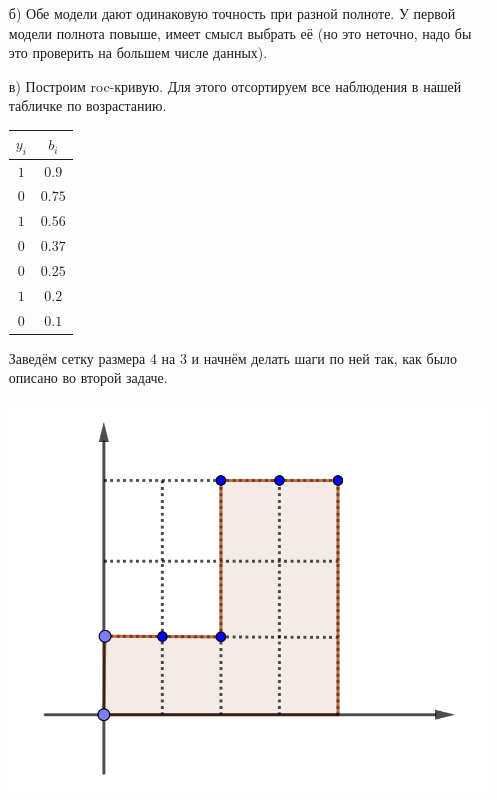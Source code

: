 \documentclass[12pt, a4paper, oneside]{article}
\begin{document}
{\begin{enumerate}
		Считаем для обоих случаев точность и полноту. 
		
		\begin{equation} 
		\begin{aligned}
		&Precision_1 = 0.5     \qquad &Recall_1 = 0.66  \\ 
		&Precision_2 = 0.5  \qquad &Recall_2 =  0.33   \\ 
		\end{aligned}
		\end{equation} 
		
		\item[б)]  Обе модели дают одинаковую точность при разной полноте. У первой модели полнота повыше, имеет смысл выбрать её (но это неточно, надо бы это проверить на большем числе данных). 
		
		\item[в)] Построим roc-кривую. Для этого отсортируем все наблюдения в нашей табличке по возрастанию.
		
		\begin{center}
			\begin{tabular}{c|c}
				$y_i$ & $b_i$ \\
				\hline
				$1$  & $0.9$ \\
				$0$ & $0.75$ \\
				$1$ & $0.56$ \\
				$0$ & $0.37$ \\	
				$0$ & $0.25$ \\			
				$1$ & $0.2$ \\												
				$0$ & $0.1$ \\
			\end{tabular}
		\end{center}
	
	Заведём сетку размера 4 на 3 и начнём делать шаги по ней так, как было описано во второй задаче.
		
	\begin{center}
		\includegraphics[width=.4\paperwidth]{roc_auc2.png}
	\end{center}
	

\end{enumerate}}
\end{document}
